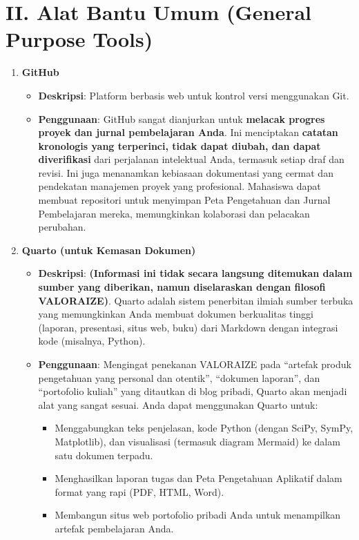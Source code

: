 \documentclass[
  letterpaper,
  DIV=11,
  numbers=noendperiod]{scrreprt}
\providecommand{\tightlist}{%
  \setlength{\itemsep}{0pt}\setlength{\parskip}{0pt}}
\begin{document}
\section{\texorpdfstring{\textbf{II. Alat Bantu Umum (General Purpose
Tools)}}{II. Alat Bantu Umum (General Purpose Tools)}}\label{ii.-alat-bantu-umum-general-purpose-tools}

\begin{enumerate}
\def\labelenumi{\arabic{enumi}.}
\item
  \textbf{GitHub}

  \begin{itemize}
  \tightlist
  \item
    \textbf{Deskripsi}: Platform berbasis web untuk kontrol versi
    menggunakan Git.
  \item
    \textbf{Penggunaan}: GitHub sangat dianjurkan untuk \textbf{melacak
    progres proyek dan jurnal pembelajaran Anda}. Ini menciptakan
    \textbf{catatan kronologis yang terperinci, tidak dapat diubah, dan
    dapat diverifikasi} dari perjalanan intelektual Anda, termasuk
    setiap draf dan revisi. Ini juga menanamkan kebiasaan dokumentasi
    yang cermat dan pendekatan manajemen proyek yang profesional.
    Mahasiswa dapat membuat repositori untuk menyimpan Peta Pengetahuan
    dan Jurnal Pembelajaran mereka, memungkinkan kolaborasi dan
    pelacakan perubahan.
  \end{itemize}
\item
  \textbf{Quarto (untuk Kemasan Dokumen)}

  \begin{itemize}
  \tightlist
  \item
    \textbf{Deskripsi}: \textbf{(Informasi ini tidak secara langsung
    ditemukan dalam sumber yang diberikan, namun diselaraskan dengan
    filosofi VALORAIZE)}. Quarto adalah sistem penerbitan ilmiah sumber
    terbuka yang memungkinkan Anda membuat dokumen berkualitas tinggi
    (laporan, presentasi, situs web, buku) dari Markdown dengan
    integrasi kode (misalnya, Python).
  \item
    \textbf{Penggunaan}: Mengingat penekanan VALORAIZE pada ``artefak
    produk pengetahuan yang personal dan otentik'', ``dokumen laporan'',
    dan ``portofolio kuliah'' yang ditautkan di blog pribadi, Quarto
    akan menjadi alat yang sangat sesuai. Anda dapat menggunakan Quarto
    untuk:

    \begin{itemize}
    \tightlist
    \item
      Menggabungkan teks penjelasan, kode Python (dengan SciPy, SymPy,
      Matplotlib), dan visualisasi (termasuk diagram Mermaid) ke dalam
      satu dokumen terpadu.
    \item
      Menghasilkan laporan tugas dan Peta Pengetahuan Aplikatif dalam
      format yang rapi (PDF, HTML, Word).
    \item
      Membangun situs web portofolio pribadi Anda untuk menampilkan
      artefak pembelajaran Anda.
    \end{itemize}
  \end{itemize}
\end{enumerate}
\end{document}
